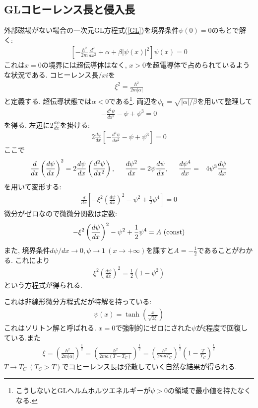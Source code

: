 \documentclass[10.5pt,a4paper]{jreport}
\begin{document}
\subsection{GLコヒーレンス長と侵入長}
外部磁場がない場合の一次元GL方程式(\ref{GL})を境界条件$\psi(0) = 0$のもとで解く:
\begin{eqnarray}
  \left[-\frac{\hbar^2}{2m}\frac{d^2}{dx^2} + \alpha + \beta|\psi(x)|^2\right]\psi(x) = 0  
\end{eqnarray}
これは$x = 0$の境界には超伝導体はなく, $x > 0$を超電導体で占められているような状況である. コヒーレンス長$/xi$を
\begin{eqnarray}
  \xi^2 = \frac{\hbar^2}{2m|\alpha|}
\end{eqnarray}
と定義する. 超伝導状態では$\alpha < 0$である\footnote{こうしないとGLヘルムホルツエネルギーが$\psi>0$の領域で最小値を持たなくなる.}. 両辺を$\psi_0 = \sqrt{|\alpha|/\beta}$を用いて整理して
\begin{eqnarray}
  -\frac{d^2\psi}{dx^2} - \psi + \psi^3 = 0
\end{eqnarray}
を得る. 左辺に$2\frac{d\psi}{dx}$を掛ける:
\begin{eqnarray}
  2\frac{d\psi}{dx}\left[-\frac{d^2\psi}{dx^2} - \psi + \psi^3\right] = 0
\end{eqnarray}
ここで
\begin{eqnarray}
  \frac{d}{dx}\left(\frac{d\psi}{dx}\right)^2 = 2\frac{d\psi}{dx}\left(\frac{d^2\psi}{dx^2}\right), \hspace{0.5cm}\frac{d\psi^2}{dx} = 2\psi\frac{d\psi}{dx}, \hspace{0.5cm}\frac{d\psi^4}{dx} &=& 4\psi^3\frac{d\psi}{dx}
\end{eqnarray}
を用いて変形する:
\begin{eqnarray}
  \frac{d}{dx}\left[-\xi^2\left(\frac{d\psi}{dx}\right)^2-\psi^2 + \frac{1}{2}\psi^4\right] = 0
\end{eqnarray}
微分がゼロなので微微分関数は定数:
\begin{eqnarray}
  -\xi^2\left(\frac{d\psi}{dx}\right)^2-\psi^2 + \frac{1}{2}\psi^4 = A\ ({\rm const})
\end{eqnarray}
また, 境界条件$d\psi/dx\rightarrow 0, \psi\rightarrow 1\ (x\rightarrow+\infty)$を課すと$A = -\frac{1}{2}$であることがわかる. これにより
\begin{eqnarray}
  \xi^2\left(\frac{d\psi}{dx}\right)^2 = \frac{1}{2}\left(1-\psi^2\right)
\end{eqnarray}
という方程式が得られる.

これは非線形微分方程式だが特解を持っている:
\begin{eqnarray}
  \psi(x) = \tanh(\frac{x}{\sqrt{2\xi}})
\end{eqnarray}
これはソリトン解と呼ばれる. $x = 0$で強制的にゼロにされた$\psi$が$\xi$程度で回復している.また
\begin{eqnarray}
  \xi = \left(\frac{\hbar^2}{2m|\alpha|}\right)^{\frac{1}{2}} = \left(\frac{\hbar^2}{2ma(T-T_C)}\right)^{\frac{1}{2}} = \left(\frac{\hbar^2}{2maT_C}\right)^{\frac{1}{2}}\left(1 - \frac{T}{T_C}\right)^{\frac{1}{2}}
\end{eqnarray}
$T\rightarrow T_C\ (T_C > T)$でコヒーレンス長は発散していく自然な結果が得られる.
\end{document}
